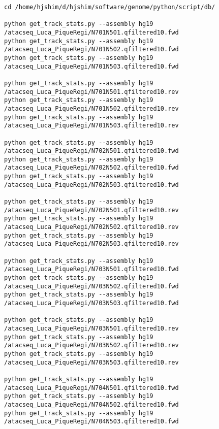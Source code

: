 \documentclass[11pt]{article}
\begin{document}
\begin{lstlisting}
cd /home/hjshim/d/hjshim/software/genome/python/script/db/

python get_track_stats.py --assembly hg19 /atacseq_Luca_PiqueRegi/N701N501.qfiltered10.fwd
python get_track_stats.py --assembly hg19 /atacseq_Luca_PiqueRegi/N701N502.qfiltered10.fwd
python get_track_stats.py --assembly hg19 /atacseq_Luca_PiqueRegi/N701N503.qfiltered10.fwd

python get_track_stats.py --assembly hg19 /atacseq_Luca_PiqueRegi/N701N501.qfiltered10.rev
python get_track_stats.py --assembly hg19 /atacseq_Luca_PiqueRegi/N701N502.qfiltered10.rev
python get_track_stats.py --assembly hg19 /atacseq_Luca_PiqueRegi/N701N503.qfiltered10.rev

python get_track_stats.py --assembly hg19 /atacseq_Luca_PiqueRegi/N702N501.qfiltered10.fwd
python get_track_stats.py --assembly hg19 /atacseq_Luca_PiqueRegi/N702N502.qfiltered10.fwd
python get_track_stats.py --assembly hg19 /atacseq_Luca_PiqueRegi/N702N503.qfiltered10.fwd

python get_track_stats.py --assembly hg19 /atacseq_Luca_PiqueRegi/N702N501.qfiltered10.rev
python get_track_stats.py --assembly hg19 /atacseq_Luca_PiqueRegi/N702N502.qfiltered10.rev
python get_track_stats.py --assembly hg19 /atacseq_Luca_PiqueRegi/N702N503.qfiltered10.rev

python get_track_stats.py --assembly hg19 /atacseq_Luca_PiqueRegi/N703N501.qfiltered10.fwd
python get_track_stats.py --assembly hg19 /atacseq_Luca_PiqueRegi/N703N502.qfiltered10.fwd
python get_track_stats.py --assembly hg19 /atacseq_Luca_PiqueRegi/N703N503.qfiltered10.fwd

python get_track_stats.py --assembly hg19 /atacseq_Luca_PiqueRegi/N703N501.qfiltered10.rev
python get_track_stats.py --assembly hg19 /atacseq_Luca_PiqueRegi/N703N502.qfiltered10.rev
python get_track_stats.py --assembly hg19 /atacseq_Luca_PiqueRegi/N703N503.qfiltered10.rev

python get_track_stats.py --assembly hg19 /atacseq_Luca_PiqueRegi/N704N501.qfiltered10.fwd
python get_track_stats.py --assembly hg19 /atacseq_Luca_PiqueRegi/N704N502.qfiltered10.fwd
python get_track_stats.py --assembly hg19 /atacseq_Luca_PiqueRegi/N704N503.qfiltered10.fwd


\end{lstlisting}
\end{document}
